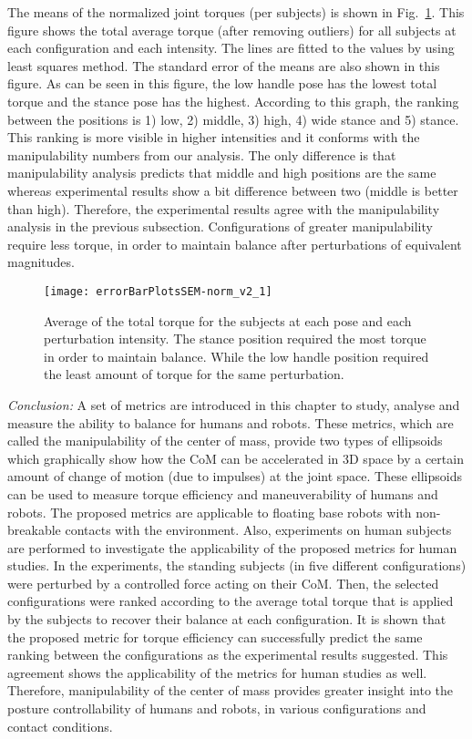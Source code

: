 The means of the normalized joint torques (per subjects) is shown in Fig.~\ref{jointtorque}. This figure shows the total average torque (after removing outliers) for all subjects at each configuration and each intensity. The lines are fitted to the values by using least squares method. The standard error of the means are also shown in this figure. As can be seen in this figure, the low handle pose has the lowest total torque and the stance pose has the highest. According to this graph, the ranking between the positions is 1) low, 2) middle, 3) high, 4) wide stance and 5) stance. This ranking is more visible in higher intensities and it conforms with the manipulability numbers from our analysis. The only difference is that manipulability analysis predicts that middle and high positions are the same whereas experimental results show a bit difference between two (middle is better than high). Therefore, the experimental results agree with the manipulability analysis in the previous subsection. Configurations of greater manipulability require less torque, in order to maintain balance after perturbations of equivalent magnitudes.
\begin{figure}
	\centering \texttt{[image: errorBarPlotsSEM-norm\_v2\_1]}
	\caption{Average of the total torque for the subjects at each pose and each perturbation intensity. The stance position required the most torque in order to maintain balance. While the low handle position required the least amount of torque for the same perturbation.}
	\label{jointtorque}
\end{figure}


\textit{Conclusion:} A set of metrics are introduced in this chapter to study, analyse and measure the ability to balance for humans and robots. These metrics, which are called the manipulability of the center of mass, provide two types of ellipsoids which graphically show how the CoM can be accelerated in 3D space by a certain amount of change of motion (due to impulses) at the joint space. These ellipsoids can be used to measure torque efficiency and maneuverability of humans and robots. The proposed metrics are applicable to floating base robots with non-breakable contacts with the environment. Also, experiments on human subjects are performed to investigate the applicability of the proposed metrics for human studies. In the experiments, the standing subjects (in five different configurations) were perturbed by a controlled force acting on their CoM. Then, the selected configurations were ranked according to the average total torque that is applied by the subjects to recover their balance at each configuration. It is shown that the proposed metric for torque efficiency can successfully predict the same ranking between the configurations as the experimental results suggested. This agreement shows the applicability of the metrics for human studies as well. Therefore, manipulability of the center of mass provides greater insight into the posture controllability of humans and robots, in various configurations and contact conditions.

